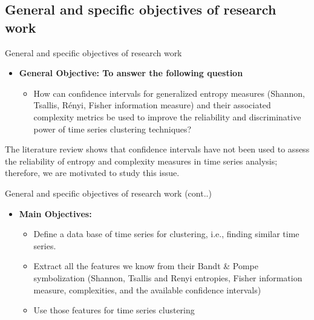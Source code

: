 \documentclass{beamer}
\begin{document}

\subsection{General and specific objectives of research work}

\begin{frame}{General and specific objectives of research work}
	\begin{itemize}
		\item \textbf{General Objective: To answer the following question}
		\begin{itemize}
			\item How can confidence intervals for generalized entropy measures (Shannon, Tsallis, Rényi, Fisher information measure) and their associated complexity metrics be used to improve the 
			reliability and discriminative power of time series clustering techniques?
		\end{itemize}
	\end{itemize}		
		
The literature review shows that confidence intervals have not been used to assess the reliability of entropy and complexity measures in time series analysis; therefore, we are motivated to study this issue.
\end{frame}

\begin{frame}{General and specific objectives of research work (cont..)}
\begin{itemize}
	\item \textbf{Main Objectives:}
	\begin{itemize}
		\item Define a data base of time series for clustering, i.e., finding similar time series. 
		\item Extract all the features we know from their Bandt \& Pompe symbolization (Shannon, Tsallis and Renyi entropies, Fisher information measure, complexities, and the available confidence intervals)
		\item Use those features for time series clustering 
	\end{itemize} 
\end{itemize}	

\end{frame}
\end{document}
